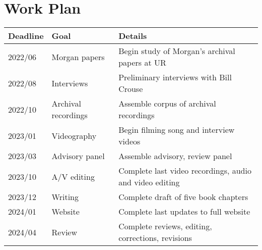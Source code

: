 \documentclass{neh}
\begin{document}
\section{Work Plan}
\begin{tabularx}{\textwidth}{llX}
    \toprule
    Deadline & Goal & Details \\
    \midrule
    2022/06 & Morgan papers & Begin study of Morgan's archival papers at UR \\
    2022/08 & Interviews & Preliminary interviews with Bill Crouse \\
    2022/10 & Archival recordings & Assemble corpus of archival recordings \\
    2023/01 & Videography & Begin filming song and interview videos \\
    2023/03 & Advisory panel & Assemble advisory, review panel \\
    2023/10 & A/V editing & Complete last video recordings, audio and video editing \\
    2023/12 & Writing & Complete draft of five book chapters \\
    2024/01 & Website & Complete last updates to full website \\
    2024/04 & Review & Complete reviews, editing, corrections, revisions \\
    \bottomrule
\end{tabularx}
\end{document}
